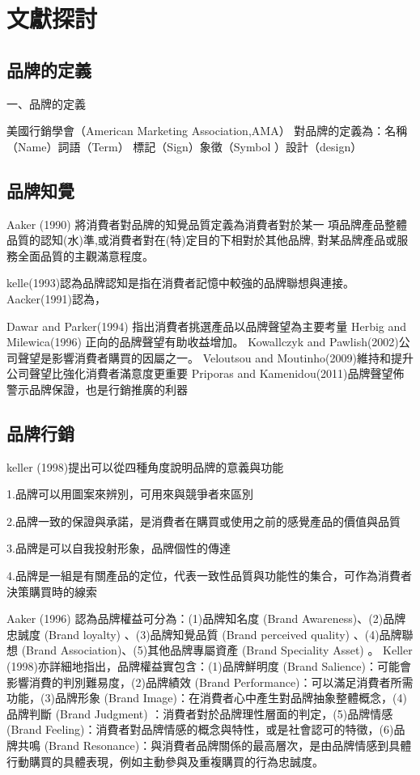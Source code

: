 \chapter{文獻探討}


\section{品牌的定義}

一、品牌的定義

美國行銷學會（American Marketing Association,AMA）
對品牌的定義為：名稱 （Name）詞語（Term） 標記（Sign）象徵（Symbol ）設計（design）


\section{品牌知覺}
Aaker (1990) 將消費者對品牌的知覺品質定義為消費者對於某一 項品牌產品整體品質的認知(水)準,或消費者對在(特)定目的下相對於其他品牌, 對某品牌產品或服務全面品質的主觀滿意程度。

kelle(1993)認為品牌認知是指在消費者記憶中較強的品牌聯想與連接。Aacker(1991)認為，

Dawar and Parker(1994) 指出消費者挑選產品以品牌聲望為主要考量
Herbig and Milewica(1996) 正向的品牌聲望有助收益增加。
Kowallczyk and Pawlish(2002)公司聲望是影響消費者購買的因屬之一。
Veloutsou and Moutinho(2009)維持和提升公司聲望比強化消費者滿意度更重要
Priporas and Kamenidou(2011)品牌聲望佈警示品牌保證，也是行銷推廣的利器
\section{品牌行銷}

keller (1998)提出可以從四種角度說明品牌的意義與功能\cite{Aaker}

1.品牌可以用圖案來辨別，可用來與競爭者來區別

2.品牌一致的保證與承諾，是消費者在購買或使用之前的感覺產品的價值與品質

3.品牌是可以自我投射形象，品牌個性的傳達

4.品牌是一組是有關產品的定位，代表一致性品質與功能性的集合，可作為消費者決策購買時的線索

Aaker (1996) 認為品牌權益可分為：(1)品牌知名度 (Brand Awareness)、(2)品牌忠誠度 (Brand loyalty) 、(3)品牌知覺品質 (Brand perceived quality) 、(4)品牌聯想 (Brand Association)、(5)其他品牌專屬資產 (Brand Speciality Asset) 。
    Keller (1998)亦詳細地指出，品牌權益實包含：(1)品牌鮮明度 (Brand Salience)：可能會影響消費的判別難易度，(2)品牌績效 (Brand Performance)：可以滿足消費者所需功能，(3)品牌形象 (Brand Image)：在消費者心中產生對品牌抽象整體概念，(4)品牌判斷 (Brand Judgment) ：消費者對於品牌理性層面的判定，(5)品牌情感 (Brand Feeling)：消費者對品牌情感的概念與特性，或是社會認可的特徵，(6)品牌共鳴 (Brand Resonance)：與消費者品牌關係的最高層次，是由品牌情感到具體行動購買的具體表現，例如主動參與及重複購買的行為忠誠度。

